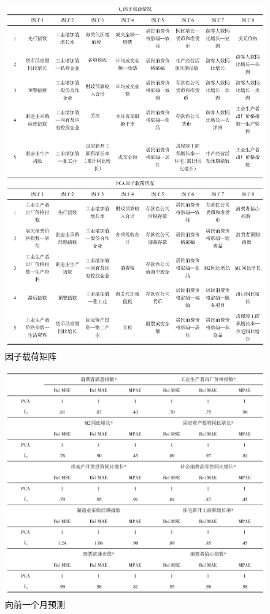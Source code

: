 \begin{figure}[H]
    \centering
    \includegraphics[width=.9\textwidth]{pics/factors.jpg}
    \caption{\small 因子载荷矩阵}
    \label{diff-factors}
\end{figure}

\begin{figure}[H]
    \centering
    \includegraphics[width=.9\textwidth]{pics/one-month.jpg}
    \caption{\small 向前一个月预测}
    \label{one-month}
\end{figure}


